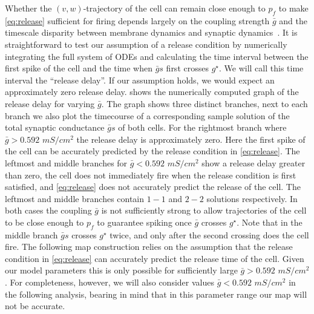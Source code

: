 Whether the \((v,w)\)-trajectory of the \quiet{} cell can remain close enough to \(p_{f}\) to make \cref{eq:release} sufficient for firing depends largely on the coupling strength \(\bar g\) and the timescale disparity between membrane dynamics and synaptic dynamics~\citep{bose2011}.
It is straightforward to test our assumption of a release condition by numerically integrating the full system of ODEs and calculating the time interval between the first spike of the \quiet{} cell and the time when \(\bar g s\) first crosses \(g^{\star}\).
We will call this time interval the ``release delay''.
If our assumption holds, we would expect an approximately zero release delay.
 shows the numerically computed graph of the release delay for varying \(\bar g\).
The graph shows three distinct branches, next to each branch we also plot the timecourse of a corresponding sample solution of the total synaptic conductance \(\bar g s\) of both cells.
For the rightmost branch where \(\bar g>0.592\) \(\si{mS/cm^{2}}\) the release delay is approximately zero.
Here the first spike of the \quiet{} cell can be accurately predicted by the release condition in \cref{eq:release}.
The leftmost and middle branches for \(\bar g<0.592\) \(\si{mS/cm^{2}}\)  show a release delay greater than zero, the \quiet{} cell does not immediately fire when the release condition is first satisfied, and \cref{eq:release} does not accurately predict the release of the \quiet{} cell.
The leftmost and middle branches contain \(1-1\) and \(2-2\) solutions respectively.
In both cases the coupling \(\bar g\) is not sufficiently strong to allow trajectories of the \quiet{} cell to be close enough to \(p_{f}\) to guarantee spiking once \(\bar g\) crosses \(g^{\star}\).
Note that in the middle branch \(\bar g s \) crosses \(g^{\star}\) twice, and only after the second crossing does the \quiet{} cell fire.
The following map construction relies on the assumption that the release condition in \cref{eq:release} can accurately predict the release time of the \quiet{} cell.
Given our model parameters this is only possible for sufficiently large \(\bar g>0.592 \) \(\si{mS/cm^{2}}\).
For completeness, however, we will also consider values \(\bar g < 0.592\) \(\si{mS/cm^{2}}\) in the following analysis, bearing in mind that in this parameter range our map will not be accurate.

